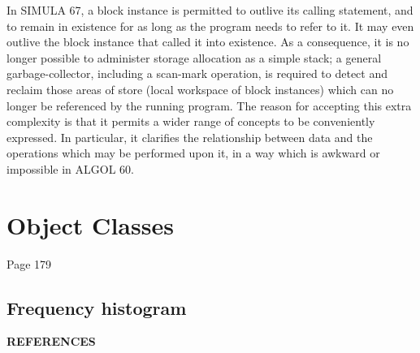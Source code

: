In SIMULA 67, a block instance is permitted to outlive its calling statement, and to remain in existence for as long as the program needs to refer to it. It may even outlive the block instance that called it into existence. As a consequence, it is no longer possible to administer storage allocation as a simple stack; a general garbage-collector, including a scan-mark operation, is required to detect and reclaim those areas of store (local workspace of block instances) which can no longer be referenced by the running program. The reason for accepting this extra complexity is that it permits a wider range of concepts to be conveniently expressed. In particular, it clarifies the relationship between data and the operations which may be performed upon it, in a way which is awkward or impossible in ALGOL 60.

\section[Object classes]{Object Classes}

Page 179

\subsection{Frequency histogram}
\label{sec:frequency-histogram}

\bigskip

\noindent
\textbf{REFERENCES}
\medskip\nopagebreak


